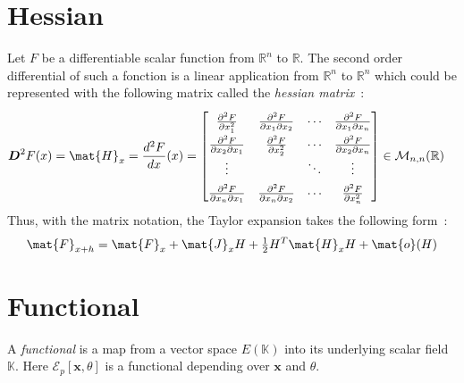 \section{Hessian}
Let $F$ be a differentiable scalar function from $\mathbb{R}^n$ to $\mathbb{R}$. The second order differential of such a fonction is a linear application from $\mathbb{R}^n$ to $\mathbb{R}^n$ which could be represented with the following matrix called the \emph{hessian matrix}~:
\begin{equation}
\renewcommand\arraystretch{1.5}
\begin{aligned}
	&\boldsymbol{D}^{2}F(x) = \mat{H}_{x} = \frac{d^2F}{dx}(x) =
	\begin{bmatrix}
		\frac{\partial^2 F}{\partial x_1^2} & \frac{\partial^2 F}{\partial x_1\partial x_2} &\cdots & \frac{\partial^2 F}{\partial x_1\partial x_n} \\
		\frac{\partial^2 F}{\partial x_2\partial x_1} & \frac{\partial^2 F}{\partial x_2^2} &\cdots & \frac{\partial^2 F}{\partial x_2\partial x_n} \\
		\vdots & &\ddots & \vdots \\
		\frac{\partial^2 F}{\partial x_n\partial x_1} & \frac{\partial^2 F}{\partial x_n\partial x_2}&\cdots & \frac{\partial^2 F}{\partial x_n^2}
	\end{bmatrix}
	\in\mathcal{M}_{n,n}(\mathbb{R})
\end{aligned}
\end{equation}
Thus, with the matrix notation, the Taylor expansion takes the following form~:
\begin{align}
	\mat{F}_{x+h} = \mat{F}_{x} +  \mat{J}_{x} H + \tfrac{1}{2}H^T \mat{H}_{x} H + \mat{o}(H)
\end{align}


\section{Functional}
A \emph{functional} is a map from a vector space $E(\mathbb{K})$ into its underlying scalar field $\mathbb{K}$. Here $\mathcal{E}_p[\boldsymbol{x},\theta]$ is a functional depending over $\boldsymbol{x}$ and $\theta$.